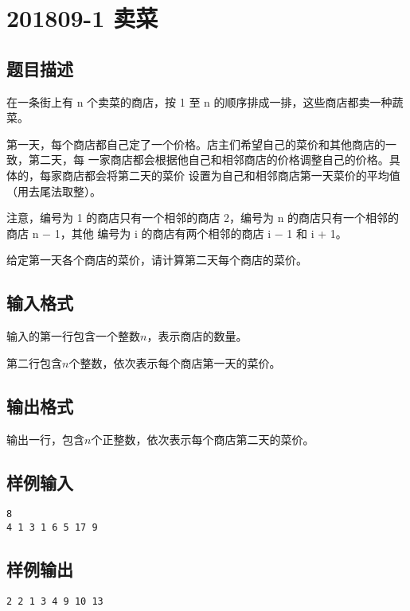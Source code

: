 \section{201809-1 卖菜}

\subsection{题目描述}%
在一条街上有 n 个卖菜的商店，按 1 至 n 的顺序排成一排，这些商店都卖一种蔬菜。

第一天，每个商店都自己定了一个价格。店主们希望自己的菜价和其他商店的一致，第二天，每
一家商店都会根据他自己和相邻商店的价格调整自己的价格。具体的，每家商店都会将第二天的菜价
设置为自己和相邻商店第一天菜价的平均值（用去尾法取整）。

注意，编号为 1 的商店只有一个相邻的商店 2，编号为 n 的商店只有一个相邻的商店 n − 1，其他
编号为 i 的商店有两个相邻的商店 i − 1 和 i + 1。

给定第一天各个商店的菜价，请计算第二天每个商店的菜价。
\subsection{输入格式}

输入的第一行包含一个整数$n$，表示商店的数量。

第二行包含$n$个整数，依次表示每个商店第一天的菜价。

\subsection{输出格式}

输出一行，包含$n$个正整数，依次表示每个商店第二天的菜价。

\subsection{样例输入}

\begin{lstlisting}[numbers=none]
8
4 1 3 1 6 5 17 9
\end{lstlisting}

\subsection{样例输出}

\begin{lstlisting}[numbers=none]
2 2 1 3 4 9 10 13
\end{lstlisting}


